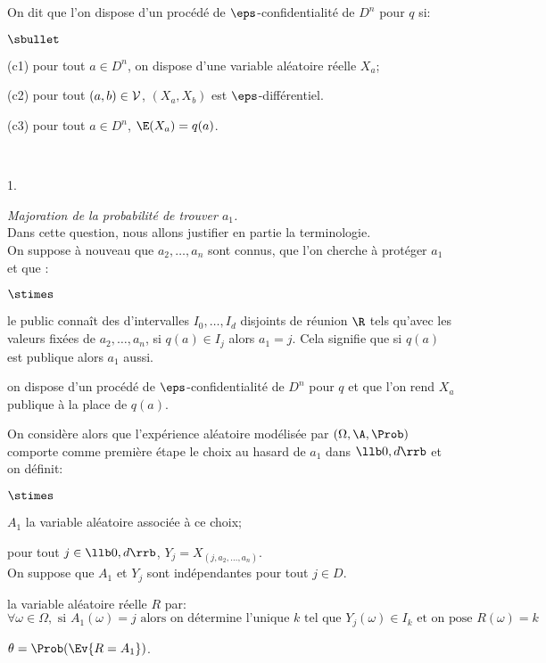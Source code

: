 On dit que l'on dispose d'un procédé de $\eps$-confidentialité de
$D^n$ pour $q$ si:
\begin{liste}{$\sbullet$}
\item[(c1)] pour tout $a\in D^n$, on dispose d'une variable aléatoire
  réelle $X_a$;
\item[(c2)] pour tout $(a,b) \in {\cal V}$, $(X_a,X_b)$ est
  $\eps$-différentiel.
\item[(c3)] pour tout $a\in D^n$, $\E(X_a) = q(a)$.
\end{liste}~\\[-.4cm]
\begin{noliste}{1.}
  \setcounter{enumi}{12} %
  \setlength{\itemsep}{4mm}
\item {\em Majoration de la probabilité de trouver $a_1$.}\\
  Dans cette question, nous allons justifier en partie la
  terminologie.\\
  On suppose à nouveau que $a_2, \ldots ,a_n$ sont connus, que l'on
  cherche à protéger $a_1$ et que :
  \begin{noliste}{$\stimes$}
  \item le public connaît des d'intervalles $I_0,\ldots,I_d$ disjoints
    de réunion $\R$ tels qu'avec les valeurs fixées de $a_2, \ldots,
    a_n$, si $q(a) \in I_j$ alors $a_1 = j$. Cela signifie que si
    $q(a)$ est publique alors $a_1$ aussi.
  \item on dispose d'un procédé de $\eps$-confidentialité de $D^n$
    pour $q$ et que l'on rend $X_a$ publique à la place de $q(a)$.
  \end{noliste}
  On considère alors que l'expérience aléatoire modélisée par
  $(\Omega, \A, \Prob)$ comporte comme première étape le choix au
  hasard de $a_1$ dans $\llb 0, d \rrb$ et on définit:
  \begin{noliste}{$\stimes$}
  \item $A_1$ la variable aléatoire associée à ce choix;
  \item pour tout $j \in \llb 0, d \rrb$, $Y_j = X_{(j, a_2, \ldots,
      a_n)}$. \\
    On suppose que $A_1$ et $Y_j$ sont indépendantes pour tout $j\in
    D$.
  \item la variable aléatoire réelle $R$ par:
    \[
    \forall \omega\in\Omega, \text{ si } A_1(\omega) = j \text{ alors
      on détermine l'unique } k \text{ tel que } Y_j(\omega)\in I_k
    \text{ et on pose } R(\omega)=k
    \]
  \item $\theta = \Prob(\Ev{R = A_1})$.
  \end{noliste}



\end{noliste}
